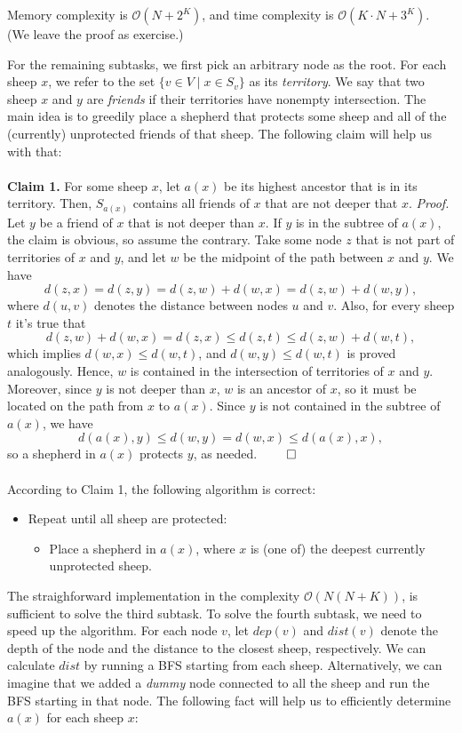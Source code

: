 Memory complexity is $\mathcal{O}(N + 2^K)$, and time complexity is 
$\mathcal{O}(K \cdot N + 3^K)$. (We leave the proof as exercise.) 


For the remaining subtasks, we first pick an arbitrary node as the root.
For each sheep $x$, we refer to the set $\{v \in V \mid x \in S_v\}$ as its
\textit{territory}. We say that two sheep $x$ and $y$ are \textit{friends} if
their territories have nonempty intersection. The main idea is to greedily place
a shepherd that protects some sheep and all of the (currently) unprotected friends
of that sheep. The following claim will help us with that:
\\\\
\textbf{Claim 1.} For some sheep $x$, let $a(x)$ be its highest ancestor that
is in its territory. Then, $S_{a(x)}$ contains all friends of $x$ that are not
deeper that $x$.
\textit{Proof.} Let $y$ be a friend of $x$ that is not deeper than $x$. If $y$
is in the subtree of $a(x)$, the claim is obvious, so assume the contrary. Take
some node $z$ that is not part of territories of $x$ and $y$, and let $w$ be the
midpoint of the path between $x$ and $y$. We have
$$d(z, x) = d(z, y) = d(z, w) + d(w, x) = d(z, w) + d(w, y),$$ where $d(u, v)$
denotes the distance between nodes $u$ and $v$. Also, for every sheep $t$ it's
true that 
$$d(z, w) + d(w, x) = d(z, x) \leq d(z, t) \leq d(z, w) + d(w, t),$$ which
implies
$d(w, x) \leq d(w, t)$, and $d(w, y) \leq d(w, t)$ is proved analogously.
Hence, $w$ is contained in the intersection of territories of $x$ and $y$.
Moreover, since $y$ is not deeper than $x$, $w$ is an ancestor of $x$, so it
must be located on the path from $x$ to $a(x)$. Since $y$ is not contained in
the subtree of $a(x)$, we have $$d(a(x), y) \leq
d(w, y) = d(w, x) \leq d(a(x), x),$$ so a shepherd in $a(x)$ protects $y$, as
needed. $\qed$
\\\\
According to Claim 1, the following algorithm is correct:
\begin{itemize}
    \item Repeat until all sheep are protected:
    \begin{itemize}
        \item Place a shepherd in $a(x)$, where $x$ is (one of) the deepest
            currently unprotected sheep.
    \end{itemize}
\end{itemize}

The straighforward implementation in the complexity $\mathcal{O}(N(N + K))$,
is sufficient to solve the third subtask. To solve the fourth subtask, we need
to speed up the algorithm. For each node $v$, let $dep(v)$ and $dist(v)$
denote the depth of the node and the distance to the closest sheep, 
respectively. We can calculate $dist$ by running a BFS starting from each sheep.
Alternatively, we can
imagine that we added a \textit{dummy} node connected to all the sheep and run
the BFS starting in that node. The following fact will help us to
efficiently determine $a(x)$ for each sheep $x$: \\\\

